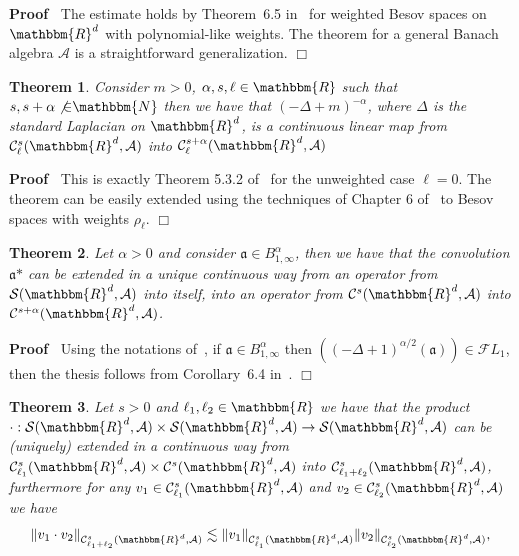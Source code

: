 \documentclass[11pt]{article}
\newcommand{\asterisk}{\mathord{*}}
\newenvironment{proof}{\noindent\textbf{Proof\ }}{\hspace*{\fill}$\Box$\medskip}
\newtheorem{theorem}{Theorem}
\begin{document}
\begin{proof}
  The estimate holds by Theorem~6.5 in~{\cite{TriebelIII}} for weighted Besov
  spaces on $\mathbbm{R}^d$ with polynomial-like weights. The theorem for a
  general Banach algebra $\mathcal{A}$ is a straightforward generalization.
\end{proof}

\begin{theorem}
  \label{theorem_laplacian}Consider $m > 0$, $\alpha, s, \ell \in \mathbbm{R}$
  such that $s, s + \alpha \not{\in} \mathbbm{N}$ then we have that $(- \Delta
  + m)^{- \alpha}$, where $\Delta$ is the standard Laplacian on
  $\mathbbm{R}^d$, is a continuous linear map from $\mathcal{C}^s_{\ell}
  (\mathbbm{R}^d, \mathcal{A})$ into $\mathcal{C}^{s + \alpha}_{\ell}
  (\mathbbm{R}^d, \mathcal{A})$
\end{theorem}

\begin{proof}
  This is exactly Theorem 5.3.2 of~{\cite{Amann2019}} for the unweighted case
  $\ell = 0$. The theorem can be easily extended using the techniques of
  Chapter 6 of~{\cite{TriebelIII}} to Besov spaces with weights $\rho_{\ell}$.
\end{proof}

\begin{theorem}
  \label{theorem_convolution}Let $\alpha > 0$ and consider $\mathfrak{a} \in
  B^{\alpha}_{1, \infty}$, then we have that the convolution $\mathfrak{a}
  \asterisk$ can be extended in a unique continuous way from an operator from
  $\mathcal{S} (\mathbbm{R}^d, \mathcal{A})$ into itself, into an operator from
  $\mathcal{C}^s (\mathbbm{R}^d, \mathcal{A})$ into $\mathcal{C}^{s + \alpha}
  (\mathbbm{R}^d, \mathcal{A})$.
\end{theorem}

\begin{proof}
  Using the notations of~{\cite{Amann1997}}, if $\mathfrak{a \in}
  B^{\alpha}_{1, \infty}$ then $((- \Delta + 1)^{\alpha / 2} (\mathfrak{a}))
  \in \mathcal{F} L_1$, then the thesis follows from Corollary~6.4
  in~{\cite{Amann1997}}.
\end{proof}

\begin{theorem}
  \label{theorem_multiplication}Let $s > 0$ and $\ell_1, \ell_2 \in
  \mathbbm{R}$ we have that the product $\cdot : \mathcal{S} (\mathbbm{R}^d,
  \mathcal{A}) \times \mathcal{S} (\mathbbm{R}^d, \mathcal{A}) \rightarrow
  \mathcal{S} (\mathbbm{R}^d, \mathcal{A})$ can be (uniquely) extended in a
  continuous way from $\mathcal{C}^s_{\ell_1} (\mathbbm{R}^d, \mathcal{A})
  \times \mathcal{C}^s (\mathbbm{R}^d, \mathcal{A})$ into
  $\mathcal{C}^s_{\ell_1 + \ell_2} (\mathbbm{R}^d, \mathcal{A})$, furthermore
  for any $v_1 \in \mathcal{C}^s_{\ell_1} (\mathbbm{R}^d, \mathcal{A})$ and
  $v_2 \in \mathcal{C}^s_{\ell_2} (\mathbbm{R}^d, \mathcal{A})$ we have
  \[ \| v_1 \cdot v_2 \|_{\mathcal{C}^s_{\ell_1 + \ell_2} (\mathbbm{R}^d,
     \mathcal{A})} \lesssim \| v_1 \|_{\mathcal{C}^s_{\ell_1} (\mathbbm{R}^d,
     \mathcal{A})}  \| v_2 \|_{\mathcal{C}^s_{\ell_2} (\mathbbm{R}^d,
     \mathcal{A})}, \]
\end{theorem}
\end{document}
